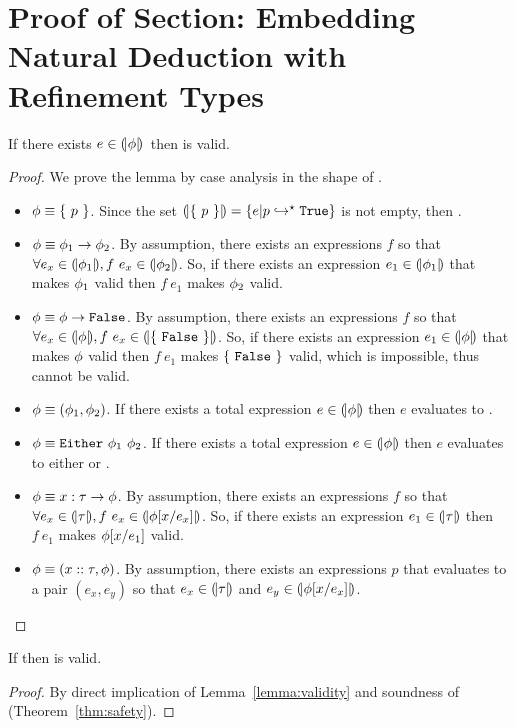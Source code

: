 \section{Proof of Section: Embedding Natural Deduction with Refinement Types}

\begin{lemma}[Validity]\label{lemma:validity}
If there exists $e\in(\!|\phi|\!)$\ then \formula is valid.
\end{lemma}
\begin{proof}
We prove the lemma by case analysis in the shape of \formula. 
\begin{itemize}
\item $\phi \equiv \{\ p\ \}$.
Since the set
 $(\!|\{\ p\ \}|\!) = \{e | {p}\hookrightarrow^{\star}{\texttt{True}} \}$
 is not empty, then  .
% 
\item $\formula \equiv {\formula_1} \rightarrow {\formula_2}$. 
By assumption, there exists an expressions $f$ so that 
$\forall e_x \in (\!|\phi_1|\!), f\ e_x \in (\!|\phi_2|\!)$. 
%
So, if there exists an expression 
$e_1 \in (\!|\phi_1|\!)$ that makes $\phi_1$ valid 
then $f\ e_1$ makes $\phi_2$ valid. 
\item $\phi \equiv {\ensuremath{\phi}} \rightarrow {\ensuremath{\texttt{False}}}$. 
By assumption, there exists an expressions $f$ so that 
$\forall e_x \in \embed{\formula}, f\ e_x \in \embed{\proofterm{\efalse}}$. 
%
So, if there exists an expression 
$e_1 \in (\!|\phi|\!)$ that makes $\phi$ valid 
then $f\ e_1$ makes $\{\ \texttt{False}\ \}$ valid, which is impossible, 
thus \formula cannot be valid. 
\item $\phi \equiv (\phi_1, \phi_2)$. 
If there exists a total expression $e \in (\!|\phi|\!)$
then $e$ evaluates to . 
\item $\phi \equiv \texttt{Either}\ \phi_1\ \phi_2$. 
If there exists a total expression $e \in (\!|\phi|\!)$
then $e$ evaluates to either 
 or . 
\item $\phi \equiv x:\tau \rightarrow \phi$.
By assumption, there exists an expressions $f$ so that 
$\forall e_x \in (\!|\tau|\!), f\ e_x \in (\!|\phi[{x}/{e_x}]|\!)$. 
%
So, if there exists an expression 
$e_1 \in (\!|\tau|\!)$
then $f\ e_1$ makes $\phi[{x}/{e_1}]$ valid. 
\item $\phi \equiv (x::\tau,\phi)$.
By assumption, there exists an expressions $p$ 
that evaluates to a pair $(e_x, e_y)$ 
so that $e_x\in (\!|\tau|\!)$ and $e_y\in(\!|\phi[{x}/{e_x}]|\!)$.
\end{itemize} 
\end{proof}


\begin{theorem}[Validity]
If  then \formula is valid.
\end{theorem}
\begin{proof}
By direct implication of Lemma~\ref{lemma:validity} and soundness of \corelan (Theorem~\ref{thm:safety}).
\end{proof}